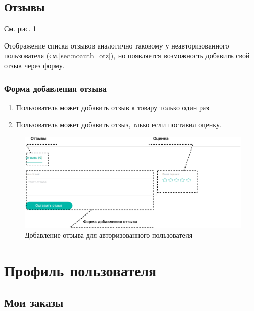         \subsection{Отзывы}

            См. рис. \ref{fig:auth_goods_cart_otz}

            Отображение списка отзывов аналогично таковому у неавторизованного
            пользователя (см.\ref{sec:noauth_otz}), но появляется возможность 
            добавить свой отзыв через форму.

            \subsubsection{Форма добавления отзыва}
            \label{sec:auth_goods_cart_otz_form}
                
                \begin{enumerate}
                    \item Пользователь может добавить отзыв к товару только 
                    один раз
                    \item Пользователь может добавить отзыз, тлько если 
                    поставил оценку.
                \end{enumerate}

           \begin{figure}
                \center
                \includegraphics[width=170mm]{04_auth_funcs/figures/06.eps}
                \caption{Добавление отзыва для авторизованного пользователя}
                \label{fig:auth_goods_cart_otz}
            \end{figure}

               
     \section{Профиль пользователя}

        \subsection{Мои заказы}\label{sec:auth_my_orders}

